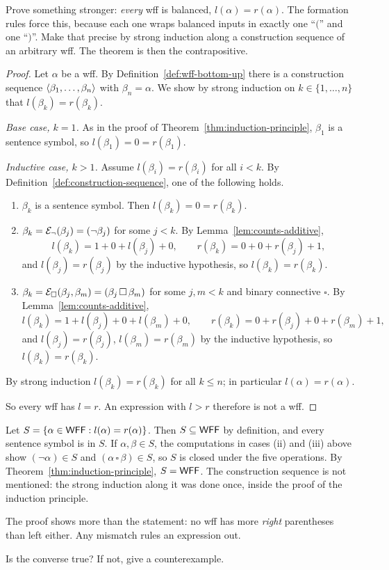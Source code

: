 \documentclass[11pt]{article}
\begin{document}
\begin{remark}
Prove something stronger: \emph{every} wff is balanced,
$l(\alpha)=r(\alpha)$. The formation rules force this, because each one
wraps balanced inputs in exactly one ``$($'' and one ``$)$''. Make that
precise by strong induction along a construction sequence of an arbitrary
wff. The theorem is then the contrapositive.
\end{remark}

\begin{proof}
Let $\alpha$ be a wff. By Definition~\ref{def:wff-bottom-up} there is a
construction sequence $\langle \beta_1,\dots,\beta_n\rangle$ with $\beta_n=\alpha$.
We show by strong induction on $k\in\{1,\dots,n\}$ that
$l(\beta_k)=r(\beta_k)$.

\emph{Base case, $k=1$.} As in the proof of
Theorem~\ref{thm:induction-principle}, $\beta_1$ is a sentence symbol, so
$l(\beta_1)=0=r(\beta_1)$.

\emph{Inductive case, $k>1$.} Assume $l(\beta_i)=r(\beta_i)$ for all $i<k$.
By Definition~\ref{def:construction-sequence}, one of the following holds.
\begin{enumerate}[label=(\roman*)]
\item $\beta_k$ is a sentence symbol. Then $l(\beta_k)=0=r(\beta_k)$.
\item $\beta_k=\mathcal{E}_{\neg}(\beta_j)=(\neg\beta_j)$ for some $j<k$. By
  Lemma~\ref{lem:counts-additive},
  \[
  l(\beta_k)=1+0+l(\beta_j)+0,\qquad r(\beta_k)=0+0+r(\beta_j)+1,
  \]
  and $l(\beta_j)=r(\beta_j)$ by the inductive hypothesis, so
  $l(\beta_k)=r(\beta_k)$.
\item $\beta_k=\mathcal{E}_{\square}(\beta_j,\beta_m)=(\beta_j\,\square\,\beta_m)$ for
  some $j,m<k$ and binary connective $\square$. By
  Lemma~\ref{lem:counts-additive},
  \[
  l(\beta_k)=1+l(\beta_j)+0+l(\beta_m)+0,\qquad
  r(\beta_k)=0+r(\beta_j)+0+r(\beta_m)+1,
  \]
  and $l(\beta_j)=r(\beta_j)$, $l(\beta_m)=r(\beta_m)$ by the inductive
  hypothesis, so $l(\beta_k)=r(\beta_k)$.
\end{enumerate}
By strong induction $l(\beta_k)=r(\beta_k)$ for all $k\le n$; in particular
$l(\alpha)=r(\alpha)$.

So every wff has $l=r$. An expression with $l>r$ therefore is not a wff.
\end{proof}

\begin{remark}
Let $S=\{\alpha\in\mathsf{WFF} : l(\alpha)=r(\alpha)\}$. Then $S\subseteq\mathsf{WFF}$ by
definition, and every sentence symbol is in $S$. If $\alpha,\beta\in S$,
the computations in cases (ii) and (iii) above show $(\neg\alpha)\in S$ and
$(\alpha\,\square\,\beta)\in S$, so $S$ is closed under the five
operations. By Theorem~\ref{thm:induction-principle}, $S=\mathsf{WFF}$. The
construction sequence is not mentioned: the strong induction along it was
done once, inside the proof of the induction principle.
\end{remark}

\begin{remark}
The proof shows more than the statement: no wff has more \emph{right}
parentheses than left either. Any mismatch rules an expression out.
\end{remark}

\begin{question}
Is the converse true? If not, give a counterexample.
\end{question}
\end{document}
